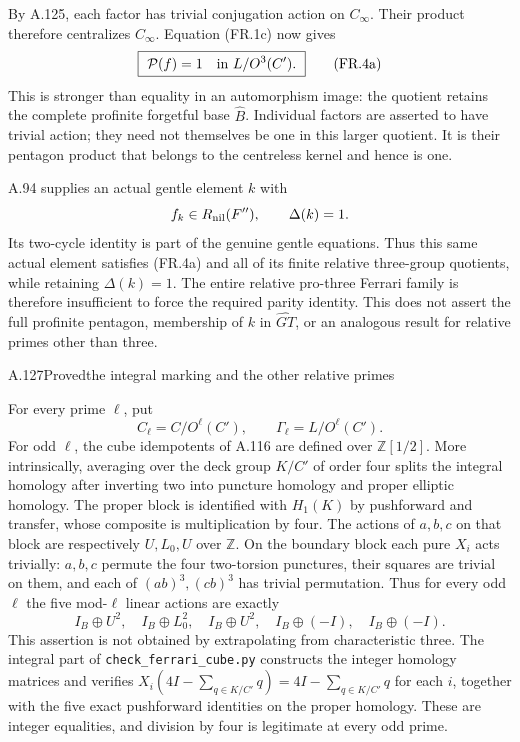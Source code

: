 By A.125, each factor has trivial conjugation action on
$C_\infty$. Their product therefore centralizes
$C_\infty$. Equation (FR.1c) now gives
\[
             \boxed{\ \mathcal P(f)=1
                       \quad\hbox{in }L/O^3(C').\ }
 \tag{FR.4a}
\]
This is stronger than equality in an automorphism image:
the quotient retains the complete profinite forgetful
base $\widehat B$. Individual factors are asserted to
have trivial action; they need not themselves be one
in this larger quotient. It is their pentagon product
that belongs to the centreless kernel and hence is one.

A.94 supplies an actual gentle element $k$ with
\[
            f_k\in R_{\rm nil}(F''),\qquad\Delta(k)=1.
\]
Its two-cycle identity is part of the genuine gentle
equations. Thus this same actual element satisfies
(FR.4a) and all of its finite relative three-group
quotients, while retaining $\Delta(k)=1$. The entire
relative pro-three Ferrari family is therefore
insufficient to force the required parity identity.
This does not assert the full profinite pentagon,
membership of $k$ in $\widehat{GT}$, or an analogous
result for relative primes other than three.

\begin{statement}{A.127}{Proved}{the integral marking and the other relative primes}
\end{statement}
For every prime $\ell$, put
\[
 C_\ell=C/O^\ell(C'),\qquad
 \Gamma_\ell=L/O^\ell(C').
 \tag{FR.5a}
\]
For odd $\ell$, the cube idempotents of A.116 are defined over
$\mathbb Z[1/2]$. More intrinsically, averaging over the deck
group $K/C'$ of order four splits the integral homology after
inverting two into puncture homology and proper elliptic homology.
The proper block is identified with $H_1(K)$ by pushforward
and transfer, whose composite is multiplication by four.
The actions of $a,b,c$ on that block are respectively $U,L_0,U$
over $\mathbb Z$. On the boundary block each pure $X_i$ acts
trivially: $a,b,c$ permute the four two-torsion punctures,
their squares are trivial on them, and each of $(ab)^3,(cb)^3$
has trivial permutation. Thus for every odd $\ell$ the five
mod-$\ell$ linear actions are exactly
\[
        I_B\oplus U^2,\quad I_B\oplus L_0^2,\quad
        I_B\oplus U^2,\quad I_B\oplus(-I),\quad
        I_B\oplus(-I).
 \tag{FR.5b}
\]
This assertion is not obtained by extrapolating from characteristic
three. The integral part of \texttt{check\_ferrari\_cube.py}
constructs the integer homology matrices and verifies
$X_i(4I-\sum_{q\in K/C'}q)=4I-\sum_{q\in K/C'}q$ for
each $i$, together with the five exact pushforward identities
on the proper homology. These are integer equalities, and
division by four is legitimate at every odd prime.

